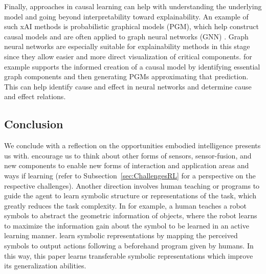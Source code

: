 \documentclass[twoside,11pt]{article}
\begin{document}
\begin{enumerate}
Finally, approaches in causal learning can help with understanding the underlying model and going beyond interpretability toward explainability.
An example of such xAI methods is probabilistic graphical models (PGM), which help construct causal models and are often applied to graph neural networks (GNN) \citep{Saranti:2019:LearningCompetencePGMs}. Graph neural networks are especially suitable for explainability methods in this stage since they allow easier and more direct visualization of critical components. \citet{Vu:2020:PGMExplainer} for example supports the informed creation of a causal model by identifying essential graph components and then generating PGMs approximating that prediction. This can help identify cause and effect in neural networks and determine cause and effect relations.

\subsection{Conclusion}

We conclude with a reflection on the opportunities embodied intelligence presents us with. \citet{RoyEtAl:2021:RLRoboticsChallenges} encourage us to think about other forms of sensors, sensor-fusion, and new components to enable new forms of interaction and application areas and ways if learning (refer to Subsection~\ref{sec:ChallengesRL} for a perspective on the respective challenges). Another direction involves human teaching \citep{kulick2013active} or programs \citep{PenkovR19,sun2019program} to guide the agent to learn symbolic structure or representations of the task, which greatly reduces the task complexity. In \citet{kulick2013active} for example, a human teaches a robot symbols to abstract the geometric information of objects, where the robot learns to maximize the information gain about the symbol to be learned in an active learning manner. \citet{PenkovR19} learn symbolic representations by mapping the perceived symbols to output actions following a beforehand program given by humans. In this way, this paper learns transferable symbolic representations which improve its generalization abilities.


\end{enumerate}
\end{document}
